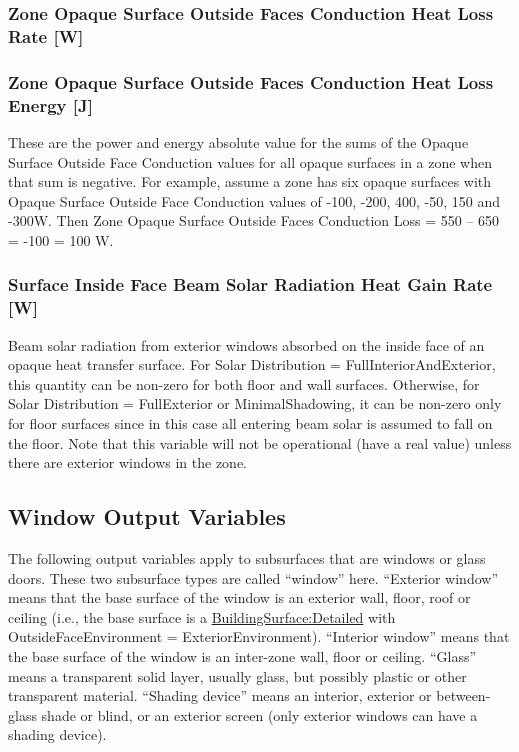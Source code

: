 \subsubsection{Zone Opaque Surface Outside Faces Conduction Heat Loss Rate {[}W{]}}\label{zone-opaque-surface-outside-face-conduction-loss-w}

\subsubsection{Zone Opaque Surface Outside Faces Conduction Heat Loss Energy {[}J{]}}\label{zone-opaque-surface-outside-face-conduction-loss-energy-j}

These are the power and energy absolute value for the sums of the Opaque Surface Outside Face Conduction values for all opaque surfaces in a zone when that sum is negative. For example, assume a zone has six opaque surfaces with Opaque Surface Outside Face Conduction values of -100, -200, 400, -50, 150 and -300W. Then Zone Opaque Surface Outside Faces Conduction Loss = \textbar{}550 -- 650\textbar{} = \textbar{}-100\textbar{} = 100 W.

\subsubsection{Surface Inside Face Beam Solar Radiation Heat Gain Rate {[}W{]}}\label{surface-inside-face-beam-solar-radiation-heat-gain-rate-w}

Beam solar radiation from exterior windows absorbed on the inside face of an opaque heat transfer surface. For Solar Distribution = FullInteriorAndExterior, this quantity can be non-zero for both floor and wall surfaces. Otherwise, for Solar Distribution = FullExterior or MinimalShadowing, it can be non-zero only for floor surfaces since in this case all entering beam solar is assumed to fall on the floor. Note that this variable will not be operational (have a real value) unless there are exterior windows in the zone.

\subsection{Window Output Variables}\label{window-output-variables-1}

The following output variables apply to subsurfaces that are windows or glass doors. These two subsurface types are called ``window'' here. ``Exterior window'' means that the base surface of the window is an exterior wall, floor, roof or ceiling (i.e., the base surface is a \hyperref[buildingsurfacedetailed]{BuildingSurface:Detailed} with OutsideFaceEnvironment = ExteriorEnvironment). ``Interior window'' means that the base surface of the window is an inter-zone wall, floor or ceiling. ``Glass'' means a transparent solid layer, usually glass, but possibly plastic or other transparent material. ``Shading device'' means an interior, exterior or between-glass shade or blind, or an exterior screen (only exterior windows can have a shading device).

